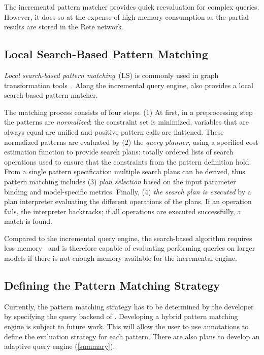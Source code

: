 \documentclass[submission,copyright,creativecommons]{eptcs}
\begin{document}
The incremental pattern matcher provides quick reevaluation for complex queries. However, it does so at the expense of high memory consumption as the partial results are stored in the Rete network.

\subsection{Local Search-Based Pattern Matching}

\emph{Local search-based pattern matching}~(LS) is commonly used in graph transformation tools~\cite{FUJABA,GrGen}. Along the incremental query engine, \eiq also provides a local search-based pattern matcher. 

The matching process consists of four steps. ($1$) At first, in a preprocessing step the patterns are \emph{normalized}: the constraint set is minimized, variables that are always equal are unified and positive pattern calls are flattened. These normalized patterns are evaluated by ($2$) the \emph{query planner}, using a specified cost estimation function to provide search plans: %
totally ordered lists of search operations used to ensure that the constraints from the pattern definition hold. From a single pattern specification multiple search plans can be derived, thus pattern matching includes ($3$) \emph{plan selection} based on the input parameter binding and model-specific metrics. Finally, ($4$) \emph{the search plan is executed} by a plan interpreter evaluating the different operations of the plans. If an operation fails, the interpreter backtracks; if all operations are executed successfully, a match is found.

Compared to the incremental query engine, the search-based algorithm requires less memory~\cite{IST15} and is therefore capable of evaluating performing queries on larger models if there is not enough memory available for the incremental engine.

\subsection{Defining the Pattern Matching Strategy}

Currently, the pattern matching strategy has to be determined by the developer by specifying the query backend of \eiq. Developing a hybrid pattern matching engine is subject to future work. This will allow the user to use annotations to define the evaluation strategy for each pattern. There are also plans to develop an adaptive query engine (\autoref{summary}).
\end{document}

